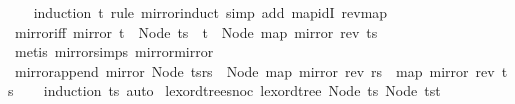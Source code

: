 \begin{isabellebody}
%
\isadelimproof
\ \ %
\endisadelimproof
%
\isatagproof
{}\isamarkupfalse%
\ {\isacharparenleft}{\kern0pt}induction\ t\ rule{\isacharcolon}{\kern0pt}\ mirror{\isachardot}{\kern0pt}induct{\isacharparenright}{\kern0pt}\ {\isacharparenleft}{\kern0pt}simp\ add{\isacharcolon}{\kern0pt}\ map{\isacharunderscore}{\kern0pt}idI\ rev{\isacharunderscore}{\kern0pt}map{\isacharparenright}{\kern0pt}%
\endisatagproof
{\isafoldproof}%
%
\isadelimproof
\isanewline
%
\endisadelimproof
\isanewline
{}\isamarkupfalse%
\ mirror{\isacharunderscore}{\kern0pt}iff{\isacharcolon}{\kern0pt}\ {\isachardoublequoteopen}mirror\ t\ {\isacharequal}{\kern0pt}\ Node\ ts\ {\isasymlongleftrightarrow}\ t\ {\isacharequal}{\kern0pt}\ Node\ {\isacharparenleft}{\kern0pt}map\ mirror\ {\isacharparenleft}{\kern0pt}rev\ ts{\isacharparenright}{\kern0pt}{\isacharparenright}{\kern0pt}{\isachardoublequoteclose}\isanewline
%
\isadelimproof
\ \ %
\endisadelimproof
%
\isatagproof
{}\isamarkupfalse%
\ {\isacharparenleft}{\kern0pt}metis\ mirror{\isachardot}{\kern0pt}simps\ mirror{\isacharunderscore}{\kern0pt}mirror{\isacharparenright}{\kern0pt}%
\endisatagproof
{\isafoldproof}%
%
\isadelimproof
\isanewline
%
\endisadelimproof
\isanewline
{}\isamarkupfalse%
\ mirror{\isacharunderscore}{\kern0pt}append{\isacharcolon}{\kern0pt}\ {\isachardoublequoteopen}mirror\ {\isacharparenleft}{\kern0pt}Node\ {\isacharparenleft}{\kern0pt}ts{\isacharat}{\kern0pt}rs{\isacharparenright}{\kern0pt}{\isacharparenright}{\kern0pt}\ {\isacharequal}{\kern0pt}\ Node\ {\isacharparenleft}{\kern0pt}map\ mirror\ {\isacharparenleft}{\kern0pt}rev\ rs{\isacharparenright}{\kern0pt}\ {\isacharat}{\kern0pt}\ map\ mirror\ {\isacharparenleft}{\kern0pt}rev\ ts{\isacharparenright}{\kern0pt}{\isacharparenright}{\kern0pt}{\isachardoublequoteclose}\isanewline
%
\isadelimproof
\ \ %
\endisadelimproof
%
\isatagproof
{}\isamarkupfalse%
\ {\isacharparenleft}{\kern0pt}induction\ ts{\isacharparenright}{\kern0pt}\ auto%
\endisatagproof
{\isafoldproof}%
%
\isadelimproof
\isanewline
%
\endisadelimproof
\isanewline
\isanewline
{}\isamarkupfalse%
\ lexord{\isacharunderscore}{\kern0pt}tree{\isacharunderscore}{\kern0pt}snoc{\isacharcolon}{\kern0pt}\ {\isachardoublequoteopen}lexord{\isacharunderscore}{\kern0pt}tree\ {\isacharparenleft}{\kern0pt}Node\ ts{\isacharparenright}{\kern0pt}\ {\isacharparenleft}{\kern0pt}Node\ {\isacharparenleft}{\kern0pt}ts{\isacharat}{\kern0pt}{\isacharbrackleft}{\kern0pt}t{\isacharbrackright}{\kern0pt}{\isacharparenright}{\kern0pt}{\isacharparenright}{\kern0pt}{\isachardoublequoteclose}\isanewline

\end{isabellebody}
